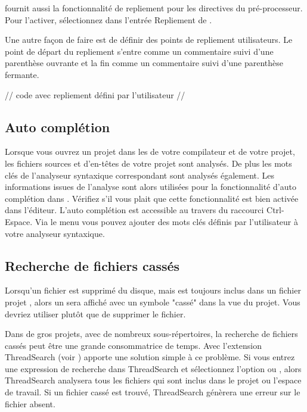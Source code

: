 
\codeblocks fournit aussi la fonctionnalité de repliement pour les directives du pré-processeur. Pour l'activer, sélectionnez  dans l'entrée Repliement de .

Une autre façon de faire est de définir des points de repliement utilisateurs. Le point de départ du repliement s'entre comme un commentaire suivi d'une parenthèse ouvrante et la fin comme un commentaire suivi d'une parenthèse fermante.

\begin{code}
//{
code avec repliement défini par l'utilisateur
//}
\end{code}

\subsection{Auto complétion}

Lorsque vous ouvrez un projet dans \codeblocks les  de votre compilateur et de votre projet, les fichiers sources et d'en-têtes de votre projet sont analysés. De plus les mots clés de l'analyseur syntaxique correspondant sont analysés également. Les informations issues de l'analyse sont alors utilisées pour la fonctionnalité d'auto complétion dans \codeblocks. Vérifiez s'il vous plait que cette fonctionnalité est bien activée dans l'éditeur. L'auto complétion est accessible au travers du raccourci Ctrl-Espace. Via le menu  vous pouvez ajouter des mots clés définis par l'utilisateur à votre analyseur syntaxique.

\subsection{Recherche de fichiers cassés}

Lorsqu'un fichier est supprimé du disque, mais est toujours inclus dans un fichier projet , alors un  sera affiché avec un symbole "cassé" dans la vue du projet. Vous devriez utiliser   plutôt que de supprimer le fichier.

Dans de gros projets, avec de nombreux sous-répertoires, la recherche de fichiers cassés peut être une grande consommatrice de temps. Avec l'extension ThreadSearch (voir ) \codeblocks apporte une solution simple à ce problème. Si vous entrez une expression de recherche dans ThreadSearch et sélectionnez l'option  ou , alors ThreadSearch analysera tous les fichiers qui sont inclus dans le projet ou l'espace de travail. Si un fichier cassé est trouvé, ThreadSearch génèrera une erreur sur le fichier absent.

